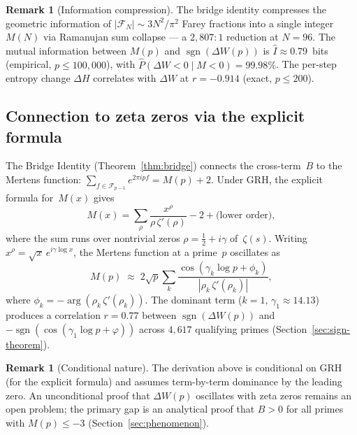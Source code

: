 \documentclass[11pt]{article}
\theoremstyle{definition}
\newtheorem{remark}[theorem]{Remark}
\newcommand{\F}{\mathcal{F}}
\DeclareMathOperator{\sgn}{sgn}
\begin{document}
\begin{remark}[Information compression]
The bridge identity compresses the geometric information of
$|\F_N| \sim 3N^2/\pi^2$ Farey fractions into a single integer
$M(N)$ via Ramanujan sum collapse --- a $2{,}807 : 1$ reduction
at $N=96$.  The mutual information between $M(p)$ and
$\sgn(\Delta W(p))$ is $\hat{I} \approx 0.79$~bits
(empirical, $p \le 100{,}000$), with
$\hat{P}(\Delta W < 0 \mid M < 0) = 99.98\%$.
The per-step entropy change $\Delta H$ correlates with
$\Delta W$ at $r = -0.914$ (exact, $p \le 200$).
\end{remark}



\subsection{Connection to zeta zeros via the explicit formula}
\label{sec:explicit-connection}

The Bridge Identity (Theorem~\ref{thm:bridge}) connects the
cross-term~$B$ to the Mertens function:
$\sum_{f \in \F_{p-1}} e^{2\pi i p f} = M(p) + 2$.
Under GRH, the explicit formula for~$M(x)$
gives~\cite{Edwards1974}
\begin{equation}\label{eq:explicit}
  M(x) = \sum_{\rho} \frac{x^{\rho}}{\rho\,\zeta'(\rho)}
  - 2 + \text{(lower order)},
\end{equation}
where the sum runs over nontrivial zeros
$\rho = \tfrac{1}{2} + i\gamma$ of~$\zeta(s)$.
Writing $x^{\rho} = \sqrt{x}\,e^{i\gamma\log x}$,
the Mertens function at a prime~$p$ oscillates as
\[
  M(p) \;\approx\;
  2\sqrt{p}\sum_{k}\frac{\cos(\gamma_k\log p + \phi_k)}
  {|\rho_k\,\zeta'(\rho_k)|},
\]
where $\phi_k = -\arg(\rho_k\,\zeta'(\rho_k))$.
The dominant term ($k = 1$, $\gamma_1 \approx 14.13$) produces
a correlation $r = 0.77$ between $\sgn(\Delta W(p))$ and
$-\sgn(\cos(\gamma_1\log p + \varphi))$ across
$4{,}617$ qualifying primes
(Section~\ref{sec:sign-theorem}).

\begin{remark}[Conditional nature]
The derivation above is conditional on GRH (for the explicit
formula) and assumes term-by-term dominance by the leading zero.
An unconditional proof that $\Delta W(p)$ oscillates with zeta
zeros remains an open problem; the primary gap is an analytical
proof that $B > 0$ for all primes with $M(p) \le -3$
(Section~\ref{sec:phenomenon}).
\end{remark}
\end{document}
